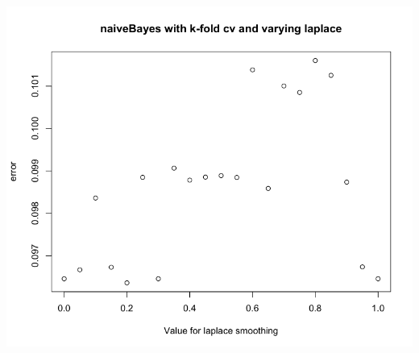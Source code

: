 \documentclass[11pt]{article}
\begin{document}
\begin{center}
\includegraphics[scale=0.35]{pix/kf_v}
\end{center}
\end{document}
